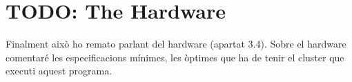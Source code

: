 
\section{TODO: The Hardware}

Finalment això ho remato parlant del hardware (apartat 3.4). Sobre el hardware
comentaré les especificacions mínimes, les òptimes que ha de tenir el cluster
que executi aquest programa.

